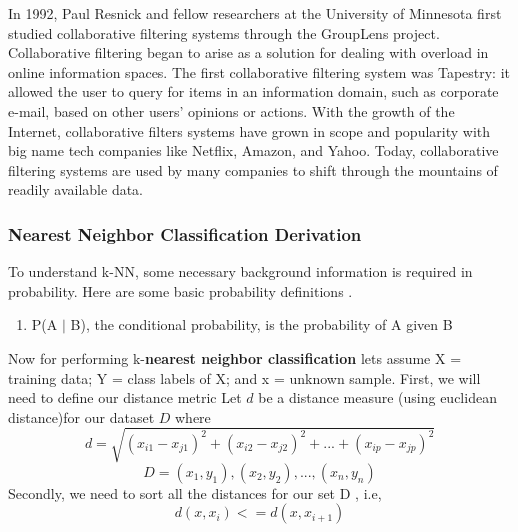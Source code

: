 \documentclass{report}
\begin{document}
In 1992, Paul Resnick and fellow researchers at the University of Minnesota first studied collaborative filtering systems through the GroupLens project\cite{2}\cite{8}.  Collaborative filtering began to arise as a solution for dealing with overload in online information spaces. The first collaborative filtering system was Tapestry: it allowed the user to query for
items in an information domain, such as corporate e-mail, based on
other users’ opinions or actions\cite{6}. With the growth of the Internet, collaborative filters systems have grown in scope and popularity with big name tech companies like Netflix, Amazon, and Yahoo. Today, collaborative filtering systems are used by many companies to shift through the mountains of readily available data.

\subsubsection{Nearest Neighbor Classification Derivation}
To understand k-NN, some necessary background information is required in probability. Here are some basic probability definitions . \cite{4}
\begin{enumerate}
	\item P(A $|$ B), the conditional probability, is the probability of A given B
\end{enumerate}
Now for performing k-\textbf{nearest neighbor classification }  lets assume X = training data; Y = class labels of X; and x = unknown sample.
\newline \newline
First, we will need to define our distance metric 
Let $d$ be a distance measure (using euclidean distance)for our dataset $D$ where
\begin{equation}
d= \sqrt{(x_{i1} - x_{j1})^2 + (x_{i2} - x_{j2})^2 + ... + (x_{ip} - x_{jp})^2}
\end{equation}
\begin{equation}
D = (x_{1}, y_{1}), (x_{2}, y_{2}), ... , (x_{n}, y_{n})
\end{equation}
Secondly, we need to sort all the distances for our set D , i.e,
\begin{equation}
d(x,x_{i}) <= d(x,x_{i+1})
\end{equation}
\end{document}
